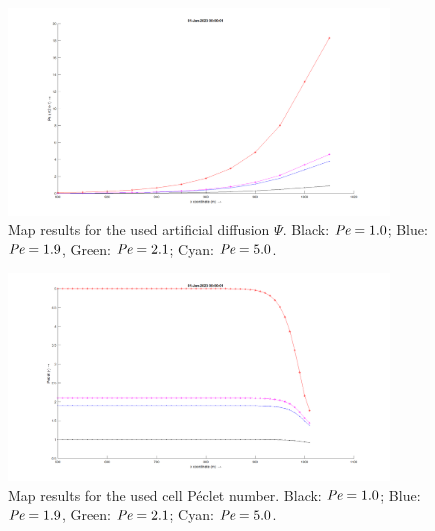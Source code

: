 \begin{figure}[H]
    \centering
    \includegraphics[width=0.9\textwidth]{figures/adv_diff_psi.png}
\caption{Map results for the used artificial diffusion $\Psi$. Black: $\textit{Pe} = 1.0$; Blue: $\textit{Pe} = 1.9$, Green: $\textit{Pe} = 2.1$; Cyan: $\textit{Pe} = 5.0$.}
\end{figure}
\begin{figure}[H]
    \centering
    \includegraphics[width=0.9\textwidth]{figures/adv_diff_peclet.png}
    \caption{Map results for the used cell P\'eclet number. Black: $\textit{Pe} = 1.0$; Blue: $\textit{Pe} = 1.9$, Green: $\textit{Pe} = 2.1$; Cyan: $\textit{Pe} = 5.0$.}
\end{figure}

